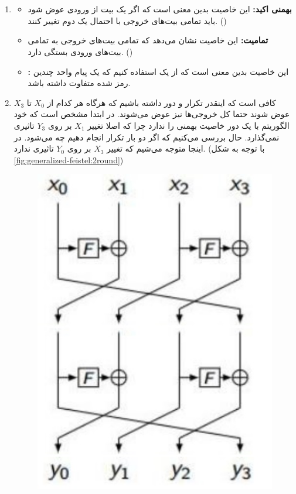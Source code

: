 \documentclass[]{article}
\begin{document}
\section{}
\begin{enumerate}
    \item \begin{itemize}
        \item \textbf{بهمنی اکید:} این خاصیت بدین معنی است که اگر یک بیت از ورودی عوض شود باید تمامی بیت‌های خروجی با احتمال یک دوم تغییر کنند. ()
        \item \textbf{تمامیت:} این خاصیت نشان می‌دهد که تمامی بیت‌های خروجی به تمامی بیت‌های ورودی بستگی دارد. ()
        \item \textbf{:} این خاصیت بدین معنی است که از یک  استفاده کنیم که یک پیام واحد چندین رمز شده متفاوت داشته باشد.
    \end{itemize}
    \item کافی است که اینقدر تکرار و دور داشته باشیم که هرگاه هر کدام از
    $X_0$ تا $X_3$
    عوض شوند حتما کل خروجی‌ها نیز عوض می‌شوند. در ابتدا مشخص است که خود الگوریتم با یک دور خاصیت بهمنی
    را ندارد چرا که اصلا تغییر
    $X_1$
    بر روی
    $Y_3$
    تاثیری نمی‌گذارد. حال بررسی می‌کنیم که اگر دو بار تکرار انجام دهیم چه می‌شود. در اینجا متوجه می‌شیم که تغییر
    $X_3$
    بر روی
    $Y_0$
    تاثیری ندارد. (با توجه به شکل \ref{fig:generalized-feistel:2round})
    \begin{figure}[H]
        \centering
        \includegraphics[scale=0.3]{pics/3-2-rounds.jpg}

\end{figure}
\end{enumerate}
\end{document}
